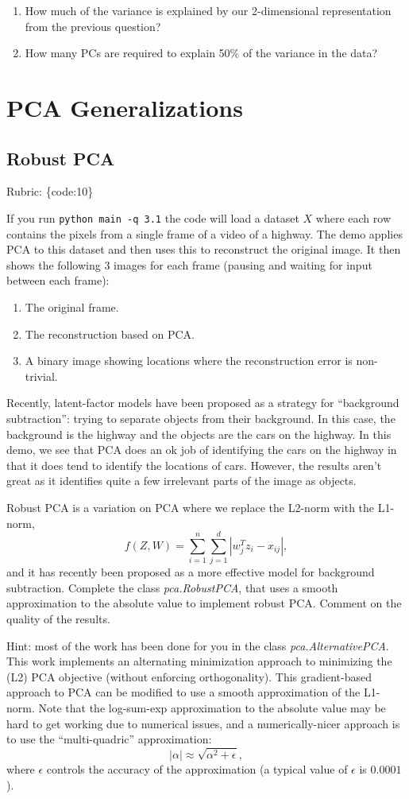 \documentclass{article}
\def\rubric#1{\gre{Rubric: \{#1\}}}{}
\def\blu#1{{\color{blu}#1}}
\def\gre#1{{\color{gre}#1}}
\def\enum#1{\begin{enumerate}#1\end{enumerate}}
\begin{document}
\blu{\enum{
\item How much of the variance is explained by our 2-dimensional representation from the previous question?
\item How many PCs are required to explain 50\% of the variance in the data?
}}

\section{PCA Generalizations}

\subsection{Robust PCA}
\rubric{code:10}

If you run \verb|python main -q 3.1| the code will load a dataset $X$ where each row contains the pixels from a single frame of a video of a highway. The demo applies PCA to this dataset and then uses this to reconstruct the original image.
It then shows the following 3 images for each frame (pausing and waiting for input between each frame):
\enum{
\item The original frame.
\item The reconstruction based on PCA.
\item A binary image showing locations where the reconstruction error is non-trivial.
}
Recently, latent-factor models have been proposed as a strategy for ``background subtraction'': trying to separate objects from their background. In this case, the background is the highway and the objects are the cars on the highway. In this demo, we see that PCA does an ok job of identifying the cars on the highway in that it does tend to identify the locations of cars. However, the results aren't great as it identifies quite a few irrelevant parts of the image as objects.

Robust PCA is a variation on PCA where we replace the L2-norm with the L1-norm,
\[
f(Z,W) = \sum_{i=1}^n\sum_{j=1}^d |w_j^Tz_i - x_{ij}|,
\]
and it has recently been proposed as a more effective model for background subtraction. \blu{Complete the class \emph{pca.RobustPCA},
that uses a smooth approximation to the absolute value to implement robust PCA. Comment on the quality of the results.}

Hint: most of the work has been done for you in the class \emph{pca.AlternativePCA}.
This work implements an alternating minimization approach to minimizing the (L2) PCA objective (without enforcing orthogonality). This gradient-based approach to PCA can be modified to use a smooth approximation of the L1-norm. Note that the log-sum-exp approximation to the absolute value may be hard to get working due to numerical issues, and a numerically-nicer approach is to use the ``multi-quadric'' approximation:
\[
|\alpha| \approx \sqrt{\alpha^2 + \epsilon},
\]
where $\epsilon$ controls the accuracy of the approximation (a typical value of $\epsilon$ is $0.0001$).
\end{document}
